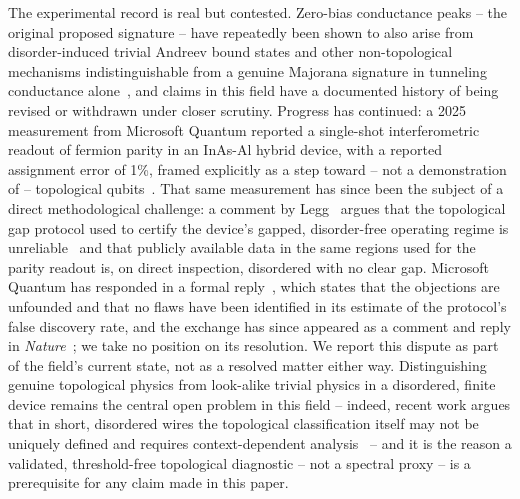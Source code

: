 \documentclass[aps,physrev,reprint,superscriptaddress,amsmath,amssymb,floatfix]{revtex4-2}
\begin{document}
The experimental record is real but contested. Zero-bias conductance
peaks -- the original proposed signature -- have repeatedly been shown to
also arise from disorder-induced trivial Andreev bound states and other
non-topological mechanisms indistinguishable from a genuine Majorana
signature in tunneling conductance
alone~\cite{prada2020review,liu2018distinguishing}, and claims in this
field have a documented history of being revised or withdrawn under
closer scrutiny. Progress has continued: a 2025 measurement from Microsoft Quantum reported a
single-shot interferometric readout of fermion parity in an InAs-Al
hybrid device, with a reported assignment error of 1\%, framed explicitly
as a step toward -- not a demonstration of -- topological
qubits~\cite{aghaee2025}. That same measurement has since been the
subject of a direct methodological challenge: a comment by
Legg~\cite{legg2025} argues that the topological gap protocol used to
certify the device's gapped, disorder-free operating regime is
unreliable~\cite{legg2026nature} and that publicly available data in the
same regions used for the parity readout is, on direct inspection,
disordered with no clear gap. Microsoft Quantum has responded in a
formal reply~\cite{msreply2025}, which states that the objections are
unfounded and that no flaws have been identified in its estimate of the
protocol's false discovery rate, and the exchange has since appeared as a
comment and reply in \emph{Nature}~\cite{legg2026nature,msreply2026nature};
we take no position on its resolution. We report
this dispute as part of the field's current state, not as a resolved
matter either way. Distinguishing genuine topological physics from look-alike
trivial physics in a disordered, finite device remains the central open
problem in this field -- indeed, recent work argues that in short,
disordered wires the topological classification itself may not be
uniquely defined and requires context-dependent
analysis~\cite{pan2026} -- and it is the reason a validated,
threshold-free topological diagnostic -- not a spectral proxy -- is a
prerequisite for any claim made in this paper.
\end{document}
